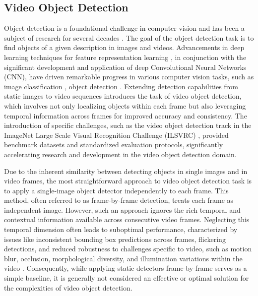 \subsection{Video Object Detection} \label{Background:VideoObjectDetection}


Object detection is a foundational challenge in computer vision and has been a subject of research for several decades \cite{fischlerRepresentationMatchingPictorial1973}. The goal of the object detection task is to find objects of a given description in images and videos.
Advancements in deep learning techniques for feature representation learning \cite{hintonReducingDimensionalityData2006, lecunDeepLearning2015}, in conjunction with the significant development and application of deep Convolutional Neural Networks (CNN), have driven remarkable progress in various computer vision tasks, such as image classification \cite{krizhevskyImageNetClassificationDeep2012}, object detection \cite{girshickRichFeatureHierarchies2014a}.
Extending detection capabilities from static images to video sequences introduces the task of video object detection, which involves not only localizing objects within each frame but also leveraging temporal information across frames for improved accuracy and consistency.
The introduction of specific challenges, such as the video object detection track in the ImageNet Large Scale Visual Recognition Challenge (ILSVRC) \cite{russakovskyImageNetLargeScale2015}, provided benchmark datasets and standardized evaluation protocols, significantly accelerating research and development in the video object detection domain.

Due to the inherent similarity between detecting objects in single images and in video frames, the most straightforward approach to video object detection task is to apply a single-image object detector independently to each frame. 
This method, often referred to as frame-by-frame detection, treats each frame as independent image. %
However, such an approach ignores the rich temporal and contextual information available across consecutive video frames. Neglecting this temporal dimension often leads to suboptimal performance, characterized by issues like inconsistent bounding box predictions across frames, flickering detections, and reduced robustness to challenges specific to video, such as motion blur, occlusion, morphological diversity, and illumination variations within the video \cite{jiaoNewGenerationDeep2022}. 
Consequently, while applying static detectors frame-by-frame serves as a simple baseline, it is generally not considered an effective or optimal solution for the complexities of video object detection. %

